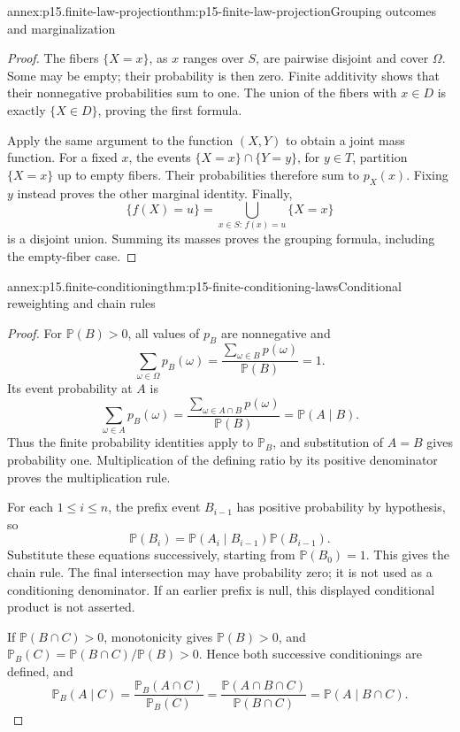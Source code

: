 \begin{annexitem}{annex:p15.finite-law-projection}{thm:p15-finite-law-projection}{Grouping outcomes and marginalization}
\begin{proof}
The fibers \(\{X=x\}\), as \(x\) ranges over \(S\), are pairwise
disjoint and cover \(\Omega\). Some may be empty; their probability is
then zero. Finite additivity shows that their nonnegative probabilities
sum to one. The union of the fibers with \(x\in D\) is exactly
\(\{X\in D\}\), proving the first formula.

Apply the same argument to the function \((X,Y)\) to obtain a joint mass
function. For a fixed \(x\), the events
\(\{X=x\}\cap\{Y=y\}\), for \(y\in T\), partition
\(\{X=x\}\) up to empty fibers. Their probabilities therefore sum to
\(p_X(x)\). Fixing \(y\) instead proves the other marginal identity.
Finally,
\[
 \{f(X)=u\}=\bigcup_{x\in S:\,f(x)=u}\{X=x\}
\]
is a disjoint union. Summing its masses proves the grouping formula,
including the empty-fiber case.
\end{proof}
\end{annexitem}

\begin{annexitem}{annex:p15.finite-conditioning}{thm:p15-finite-conditioning-laws}{Conditional reweighting and chain rules}
\begin{proof}
For \(\mathbb P(B)>0\), all values of \(p_B\) are nonnegative and
\[
 \sum_{\omega\in\Omega}p_B(\omega)
 =\frac{\sum_{\omega\in B}p(\omega)}{\mathbb P(B)}=1.
\]
Its event probability at \(A\) is
\[
 \sum_{\omega\in A}p_B(\omega)
 =\frac{\sum_{\omega\in A\cap B}p(\omega)}{\mathbb P(B)}
 =\mathbb P(A\mid B).
\]
Thus the finite probability identities apply to \(\mathbb P_B\), and
substitution of \(A=B\) gives probability one. Multiplication of the
defining ratio by its positive denominator proves the multiplication rule.

For each \(1\leq i\leq n\), the prefix event \(B_{i-1}\) has
positive probability by hypothesis, so
\[
 \mathbb P(B_i)=\mathbb P(A_i\mid B_{i-1})\mathbb P(B_{i-1}).
\]
Substitute these equations successively, starting from
\(\mathbb P(B_0)=1\). This gives the chain rule. The final intersection
may have probability zero; it is not used as a conditioning denominator.
If an earlier prefix is null, this displayed conditional product is not
asserted.

If \(\mathbb P(B\cap C)>0\), monotonicity gives
\(\mathbb P(B)>0\), and
\(\mathbb P_B(C)=\mathbb P(B\cap C)/\mathbb P(B)>0\). Hence
both successive conditionings are defined, and
\[
 \mathbb P_B(A\mid C)
 =\frac{\mathbb P_B(A\cap C)}{\mathbb P_B(C)}
 =\frac{\mathbb P(A\cap B\cap C)}{\mathbb P(B\cap C)}
 =\mathbb P(A\mid B\cap C).
\]
\end{proof}
\end{annexitem}

